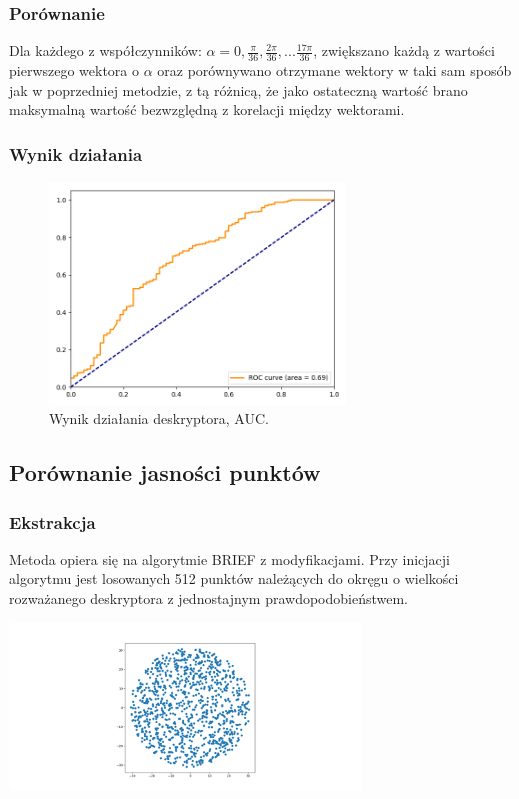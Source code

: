 \documentclass[a4paper,11pt]{article}
\begin{document}
\subsubsection{Porównanie}
Dla każdego z współczynników: $\alpha = 0, \frac{\pi}{36}, \frac{2\pi}{36},...\frac{17\pi}{36}$, zwiększano każdą z wartości pierwszego wektora o $\alpha$ oraz porównywano otrzymane wektory w taki sam sposób jak w poprzedniej metodzie, z tą różnicą, że jako ostateczną wartość brano maksymalną wartość bezwzględną z korelacji między wektorami.


\subsubsection{Wynik działania}

\begin{figure}[H]
\begin{center}
\includegraphics[width=0.7\textwidth]{./img/max_on_circle.png}
\end{center}
\caption{Wynik działania deskryptora, AUC.}
\end{figure}


\subsection{Porównanie jasności punktów}
\subsubsection{Ekstrakcja}
Metoda opiera się na algorytmie BRIEF z modyfikacjami. Przy inicjacji algorytmu jest losowanych 512 punktów należących do okręgu o wielkości rozważanego deskryptora z jednostajnym prawdopodobieństwem.

\includegraphics[width=0.7\textwidth]{./img/points.png}
\end{document}
